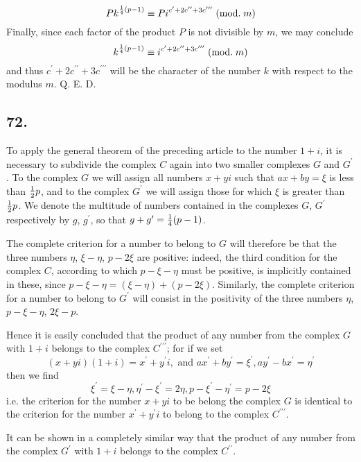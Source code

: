 \documentclass[twoside,12pt]{memoir}
\renewcommand{\pmod}[1]{\;(\textrm{mod.}\;#1)}
\let\oldfrac\frac
\def\frac#1#2{\mathchoice{\tfrac{#1}{#2}}{\oldfrac{#1}{#2}}{\genfrac{}{}{}{2}{#1}{#2\mathstrut}}{\genfrac{}{}{}{3}{#1}{#2\mathstrut}}}
\begin{document}
\[P k^{\frac{1}{4}(p-1)} \equiv P i^{c^{\prime}+2 c^{\prime \prime}+3 c^{\prime \prime \prime}}\pmod{m}\]
Finally, since each factor of the product \(P\) is not divisible by \(m\), we may conclude
\[k^{\frac{1}{4}(p-1)} \equiv i^{c^{\prime}+2 c^{\prime \prime}+3 c^{\prime \prime \prime}}\pmod{m}\]
and thus \(c^{\prime}+2 c^{\prime \prime}+3 c^{\prime \prime \prime}\) will be the character of the number \(k\) with respect to the modulus \(m\). Q. E. D.
%

\subsection*{72.}

To apply the general theorem of the preceding article to the number \(1+i\), it is necessary to subdivide the complex \(C\) again into two smaller complexes \(G\) and \(G^{\prime}\). To the complex \(G\) we will assign all numbers \(x+yi\) such that \(ax+by = \xi\) is less than \(\frac{1}{2}p\), and to the complex \(G^{\prime}\) we will assign those for which \(\xi\) is greater than \(\frac{1}{2}p\).  We denote the multitude of numbers contained in the complexes \(G\), \(G^{\prime}\) respectively by \(g\), \(g^{\prime}\), so that \(g+g^{\prime} = \frac{1}{4}(p-1)\).

The complete criterion for a number to belong to \(G\) will therefore be that the three numbers \(\eta\), \(\xi-\eta\), \(p-2\xi\) are positive: indeed, the third condition for the complex \(C\), according to which \(p-\xi-\eta\) must be positive, is implicitly contained in these, since \(p-\xi-\eta = (\xi-\eta) + (p-2\xi)\). Similarly, the complete criterion for a number to belong to \(G^{\prime}\) will consist in the positivity of the three numbers \(\eta\), \(p-\xi-\eta\), \(2\xi-p\).

Hence it is easily concluded that the product of any number from the complex \(G\) with \(1+i\) belongs to the complex \(C^{\prime\prime\prime}\); for if we set
\[(x+yi)(1+i) = x^{\prime}+y^{\prime}i, \text{ and } ax^{\prime}+by^{\prime}=\xi^{\prime}, ay^{\prime}-bx^{\prime}=\eta^{\prime}\]
then we find
\[\xi^{\prime} = \xi-\eta, \eta^{\prime}-\xi^{\prime}=2\eta, p-\xi^{\prime}-\eta^{\prime}=p-2\xi\]
i{.}e{.} the criterion for the number \(x+yi\) to be belong the complex \(G\) is identical to the criterion for the number \(x^{\prime}+y^{\prime}i\) to belong to the complex \(C^{\prime\prime\prime}\).

It can be shown in a completely similar way that the product of any number from the complex \(G^{\prime}\) with \(1+i\) belongs to the complex \(C^{\prime\prime}\).
\end{document}

